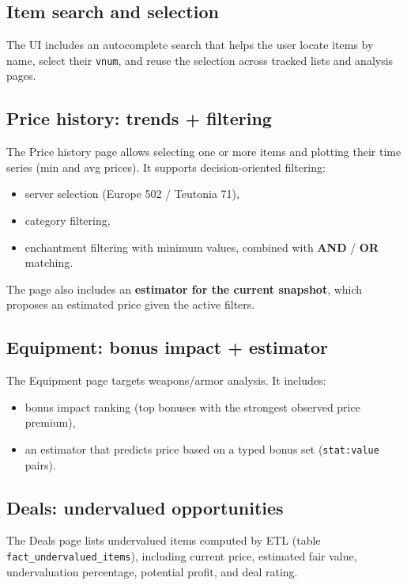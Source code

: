 \subsection{Item search and selection}
The UI includes an autocomplete search that helps the user locate items by name, select their \texttt{vnum}, and reuse the selection across tracked lists and analysis pages.

\subsection{Price history: trends + filtering}
The Price history page allows selecting one or more items and plotting their time series (min and avg prices).
It supports decision-oriented filtering:
\begin{itemize}
  \item server selection (Europe 502 / Teutonia 71),
  \item category filtering,
  \item enchantment filtering with minimum values, combined with \textbf{AND} / \textbf{OR} matching.
\end{itemize}
The page also includes an \textbf{estimator for the current snapshot}, which proposes an estimated price given the active filters.

\subsection{Equipment: bonus impact + estimator}
The Equipment page targets weapons/armor analysis.
It includes:
\begin{itemize}
  \item bonus impact ranking (top bonuses with the strongest observed price premium),
  \item an estimator that predicts price based on a typed bonus set (\texttt{stat:value} pairs).
\end{itemize}

\subsection{Deals: undervalued opportunities}
The Deals page lists undervalued items computed by ETL (table \texttt{fact\_undervalued\_items}), including current price, estimated fair value, undervaluation percentage, potential profit, and deal rating.

